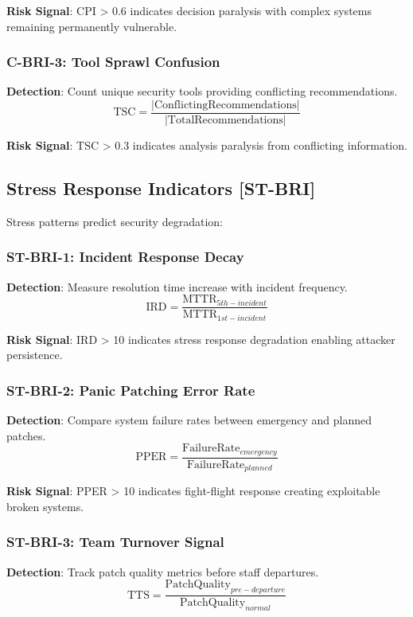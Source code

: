 \documentclass[11pt,a4paper]{article}
\begin{document}
\textbf{Risk Signal}: CPI > 0.6 indicates decision paralysis with complex systems remaining permanently vulnerable.

\subsubsection{C-BRI-3: Tool Sprawl Confusion}
\textbf{Detection}: Count unique security tools providing conflicting recommendations.
\begin{equation}
\text{TSC} = \frac{|\text{ConflictingRecommendations}|}{|\text{TotalRecommendations}|}
\end{equation}

\textbf{Risk Signal}: TSC > 0.3 indicates analysis paralysis from conflicting information.

\subsection{Stress Response Indicators [ST-BRI]}

Stress patterns predict security degradation:

\subsubsection{ST-BRI-1: Incident Response Decay}
\textbf{Detection}: Measure resolution time increase with incident frequency.
\begin{equation}
\text{IRD} = \frac{\text{MTTR}_{5th-incident}}{\text{MTTR}_{1st-incident}}
\end{equation}

\textbf{Risk Signal}: IRD > 10 indicates stress response degradation enabling attacker persistence.

\subsubsection{ST-BRI-2: Panic Patching Error Rate}
\textbf{Detection}: Compare system failure rates between emergency and planned patches.
\begin{equation}
\text{PPER} = \frac{\text{FailureRate}_{emergency}}{\text{FailureRate}_{planned}}
\end{equation}

\textbf{Risk Signal}: PPER > 10 indicates fight-flight response creating exploitable broken systems.

\subsubsection{ST-BRI-3: Team Turnover Signal}
\textbf{Detection}: Track patch quality metrics before staff departures.
\begin{equation}
\text{TTS} = \frac{\text{PatchQuality}_{pre-departure}}{\text{PatchQuality}_{normal}}
\end{equation}
\end{document}
